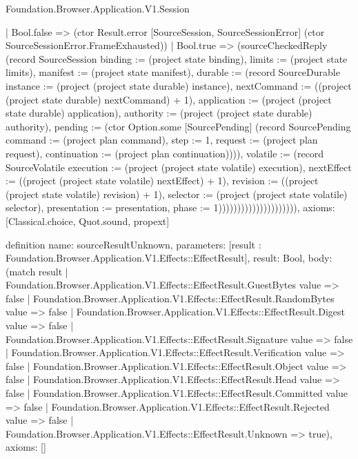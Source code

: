 \begin{lexlean}{Foundation.Browser.Application.V1.Session}
\begin{semanticmodule}
{                                      | Bool.false => (ctor Result.error [SourceSession, SourceSessionError] (ctor SourceSessionError.FrameExhausted))
                                      | Bool.true => (sourceCheckedReply (record SourceSession {binding := (project state binding), limits := (project state limits), manifest := (project state manifest), durable := (record SourceDurable {instance := (project (project state durable) instance), nextCommand := ((project (project state durable) nextCommand) + 1), application := (project (project state durable) application), authority := (project (project state durable) authority), pending := (ctor Option.some [SourcePending] (record SourcePending {command := (project plan command), step := 1, request := (project plan request), continuation := (project plan continuation)}))}), volatile := (record SourceVolatile {execution := (project (project state volatile) execution), nextEffect := ((project (project state volatile) nextEffect) + 1), revision := ((project (project state volatile) revision) + 1), selector := (project (project state volatile) selector), presentation := presentation, phase := 1})})))))))))))))))))))),
  axioms: [Classical.choice, Quot.sound, propext]
}

definition{
  name: sourceResultUnknown,
  parameters: [result : Foundation.Browser.Application.V1.Effects::EffectResult],
  result: Bool,
  body: (match result
    | Foundation.Browser.Application.V1.Effects::EffectResult.GuestBytes value => false
    | Foundation.Browser.Application.V1.Effects::EffectResult.RandomBytes value => false
    | Foundation.Browser.Application.V1.Effects::EffectResult.Digest value => false
    | Foundation.Browser.Application.V1.Effects::EffectResult.Signature value => false
    | Foundation.Browser.Application.V1.Effects::EffectResult.Verification value => false
    | Foundation.Browser.Application.V1.Effects::EffectResult.Object value => false
    | Foundation.Browser.Application.V1.Effects::EffectResult.Head value => false
    | Foundation.Browser.Application.V1.Effects::EffectResult.Committed value => false
    | Foundation.Browser.Application.V1.Effects::EffectResult.Rejected value => false
    | Foundation.Browser.Application.V1.Effects::EffectResult.Unknown => true),
  axioms: []
}


\end{semanticmodule}
\end{lexlean}
